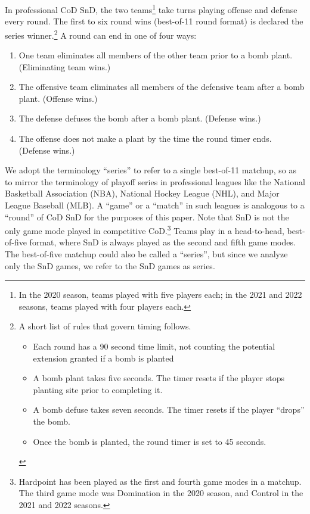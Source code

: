 \documentclass{article}
\providecommand{\tightlist}{%
  \setlength{\itemsep}{0pt}\setlength{\parskip}{0pt}}
\begin{document}
In professional CoD SnD, the two teams\footnote{In the 2020 season,
  teams played with five players each; in the 2021 and 2022 seasons,
  teams played with four players each.} take turns playing offense and
defense every round. The first to six round wins (best-of-11 round
format) is declared the series winner.\footnote{A short list of rules
  that govern timing follows.

  \begin{itemize}
  \tightlist
  \item
    Each round has a 90 second time limit, not counting the potential
    extension granted if a bomb is planted
  \item
    A bomb plant takes five seconds. The timer resets if the player
    stops planting site prior to completing it.
  \item
    A bomb defuse takes seven seconds. The timer resets if the player
    ``drops'' the bomb.
  \item
    Once the bomb is planted, the round timer is set to 45 seconds.
  \end{itemize}} A round can end in one of four ways:

\begin{enumerate}
\def\labelenumi{\arabic{enumi}.}
\tightlist
\item
  One team eliminates all members of the other team prior to a bomb
  plant. (Eliminating team wins.)
\item
  The offensive team eliminates all members of the defensive team after
  a bomb plant. (Offense wins.)
\item
  The defense defuses the bomb after a bomb plant. (Defense wins.)
\item
  The offense does not make a plant by the time the round timer ends.
  (Defense wins.)
\end{enumerate}

We adopt the terminology ``series'' to refer to a single best-of-11
matchup, so as to mirror the terminology of playoff series in
professional leagues like the National Basketball Association (NBA),
National Hockey League (NHL), and Major League Baseball (MLB). A
``game'' or a ``match'' in such leagues is analogous to a ``round'' of
CoD SnD for the purposes of this paper. Note that SnD is not the only
game mode played in competitive CoD.\footnote{Hardpoint has been played
  as the first and fourth game modes in a matchup. The third game mode
  was Domination in the 2020 season, and Control in the 2021 and 2022
  seasons.} Teams play in a head-to-head, best-of-five format, where SnD
is always played as the second and fifth game modes. The best-of-five
matchup could also be called a ``series'', but since we analyze only the
SnD games, we refer to the SnD games as series.
\end{document}
